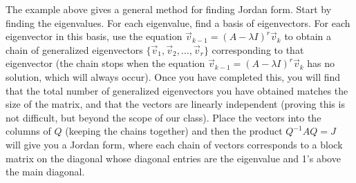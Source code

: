 \documentclass[10pt]{article}
\theoremstyle{plain}
\theoremstyle{box}
\begin{document}
The example above gives a general method for finding Jordan form. Start by finding the eigenvalues. For each eigenvalue, find a basis of eigenvectors.  For each eigenvector in this basis, use the equation $\vec v_{k-1}=(A-\lambda I)^r\vec v_k$ to obtain a chain of generalized eigenvectors $\{\vec v_1,\vec v_2, \ldots, \vec v_r\}$ corresponding to that eigenvector (the chain stops when the equation $\vec v_{k-1}=(A-\lambda I)^r\vec v_k$ has no solution, which will always occur). Once you have completed this, you will find that the total number of generalized eigenvectors you have obtained matches the size of the matrix, and that the vectors are linearly independent (proving this is not difficult, but beyond the scope of our class). Place the vectors into the columns of $Q$ (keeping the chains together) and then the product $Q^{-1}AQ=J$ will give you a Jordan form, where each chain of vectors corresponds to a block matrix on the diagonal whose diagonal entries are the eigenvalue and 1's above the main diagonal.
\end{document}
